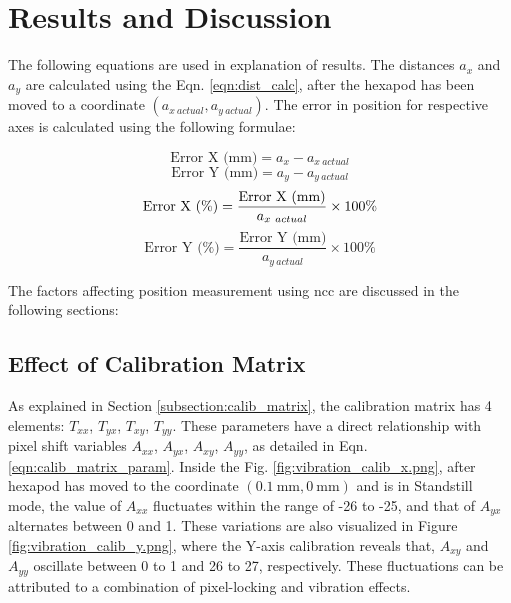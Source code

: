 \chapter{Results and Discussion} \label{chap:results_and_discussion}

The following equations are used in explanation of results. The distances $a_x$ and $a_y$ are calculated using the Eqn. \ref{eqn:dist_calc}, after the hexapod has been moved to a coordinate $(a_{x\ actual}, a_{y\ actual})$. The error in position for respective axes is calculated using the following formulae:

\begin{equation}
    \text{Error X (mm)} = a_x - a_{x\ actual}
\end{equation}
\begin{equation}
    \text{Error Y (mm)} = a_y - a_{y\ actual}
\end{equation}
\begin{equation}
    \text{Error X (\%)} = \frac{\text{Error X (mm)}}{a_{x\ actual}} \times 100\% \\
\end{equation}
\begin{equation}
    \text{Error Y (\%)} = \frac{\text{Error Y (mm)}}{a_{y\ actual}} \times 100\%
\end{equation}

\vspace{10mm}
\noindent The factors affecting position measurement using \gls{ncc} are discussed in the following sections:

\section{Effect of Calibration Matrix} \label{section:results_discussion_calib}
As explained in Section \ref{subsection:calib_matrix}, the calibration matrix has 4 elements: $T_{xx}$, $T_{yx}$, $T_{xy}$, $T_{yy}$. These parameters have a direct relationship with pixel shift variables $A_{xx}$, $A_{yx}$, $A_{xy}$, $A_{yy}$, as detailed in Eqn. \ref{eqn:calib_matrix_param}. Inside the Fig. \ref{fig:vibration_calib_x.png}, after hexapod has moved to the coordinate $(\SI{0.1}{\milli\meter}, \SI{0}{\milli\meter})$ and is in \textsf{Standstill} mode, the value of $A_{xx}$ fluctuates within the range of -26 to -25, and that of $A_{yx}$ alternates between 0 and 1. These variations are also visualized in Figure \ref{fig:vibration_calib_y.png}, where the Y-axis calibration reveals that, $A_{xy}$ and $A_{yy}$ oscillate between 0 to 1 and 26 to 27, respectively. These fluctuations can be attributed to a combination of pixel-locking and vibration effects.

